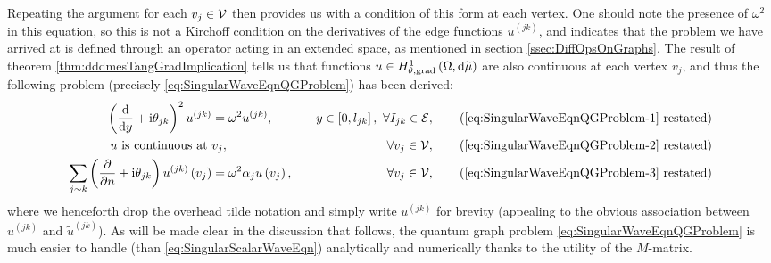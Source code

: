 Repeating the argument for each $v_j\in \mathcal{V}$ then provides us with a condition of this form at each vertex.
One should note the presence of $\omega^2$ in this equation, so this is not a Kirchoff condition on the derivatives of the edge functions $u^{(jk)}$, and indicates that the problem we have arrived at is defined through an operator acting in an extended space, as mentioned in section \ref{ssec:DiffOpsOnGraphs}.
The result of theorem \ref{thm:dddmesTangGradImplication} tells us that functions $u\in H^1_{\theta, \mathrm{grad}}\left( \Omega, \mathrm{d}\widetilde{\mu} \right)$ are also continuous at each vertex $v_j$, and thus the following problem (precisely \eqref{eq:SingularWaveEqnQGProblem}) has been derived:
\begin{subequations}
	\begin{align*}
		-\bracs{\diff{}{y} + \rmi\qm_{jk}}^2 u^{(jk)} &= \omega^2 u^{(jk)}, \quad &y\in\sqbracs{0,l_{jk}}, \ \forall I_{jk}\in\edgeSet, \tag{\eqref{eq:SingularWaveEqnQGProblem-1} restated} \\
		u \text{ is continuous at } & v_j, \quad &\forall v_j\in\vertSet,  \tag{\eqref{eq:SingularWaveEqnQGProblem-2} restated} \\
		\sum_{j\con k}\bracs{\pdiff{}{n} + \rmi\qm_{jk}}u^{(jk)}\bracs{v_j} &= \omega^2\alpha_j u\bracs{v_j}, \quad &\forall v_j\in\vertSet, \tag{\eqref{eq:SingularWaveEqnQGProblem-3} restated}
	\end{align*}
\end{subequations}
where we henceforth drop the overhead tilde notation and simply write $u^{(jk)}$ for brevity (appealing to the obvious association between $u^{(jk)}$ and $\tilde{u}^{(jk)}$).
As will be made clear in the discussion that follows, the quantum graph problem \eqref{eq:SingularWaveEqnQGProblem} is much easier to handle (than \eqref{eq:SingularScalarWaveEqn}) analytically and numerically thanks to the utility of the $M$-matrix.

